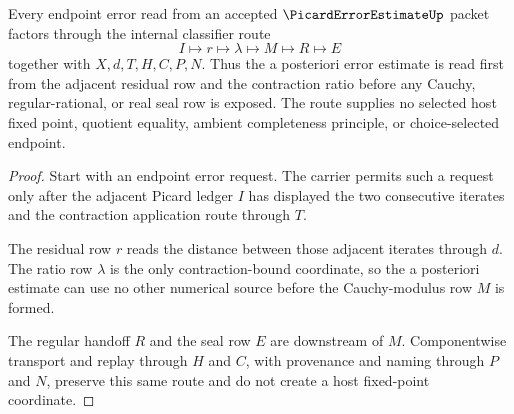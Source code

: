\begin{theorem}\label{thm:picard-error-estimate-aposteriori-bound}
Every endpoint error read from an accepted $\PicardErrorEstimateUp$ packet factors through the internal classifier route
$$
I\longmapsto r\longmapsto \lambda\longmapsto M\longmapsto R\longmapsto E
$$
together with $X,d,T,H,C,P,N$. Thus the a posteriori error estimate is read first from the adjacent residual row and the contraction ratio before any Cauchy, regular-rational, or real seal row is exposed. The route supplies no selected host fixed point, quotient equality, ambient completeness principle, or choice-selected endpoint.
\end{theorem}
\begin{proof}
Start with an endpoint error request. The carrier permits such a request only after the adjacent Picard ledger $I$ has displayed the two consecutive iterates and the contraction application route through $T$.

The residual row $r$ reads the distance between those adjacent iterates through $d$. The ratio row $\lambda$ is the only contraction-bound coordinate, so the a posteriori estimate can use no other numerical source before the Cauchy-modulus row $M$ is formed.

The regular handoff $R$ and the seal row $E$ are downstream of $M$. Componentwise transport and replay through $H$ and $C$, with provenance and naming through $P$ and $N$, preserve this same route and do not create a host fixed-point coordinate.
\end{proof}




